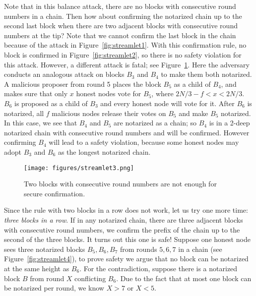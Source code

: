 \documentclass{article}
\begin{document}
 Note that in this balance attack, there are no blocks with consecutive round numbers in a chain. Then how about confirming the notarized chain up to the second last block when there are two adjacent blocks with consecutive round numbers at the tip? Note that we cannot confirm the last block in the chain because of the attack in Figure~\ref{fig:streamlet1}. With this confirmation rule, no block is confirmed in Figure~\ref{fig:streamlet2}, so there is no safety violation for this attack. However, a different  attack is fatal; see   Figure~\ref{fig:streamlet3}. Here the adversary conducts an analogous attack on blocks $B_3$ and $B_4$ to make them both notarized.  A malicious proposer from round 5 places the block $B_5$ as a child of $B_4$, and makes sure that only $x$ honest nodes vote for $B_5$, where $2N/3 -f<x<2N/3$. $B_6$ is proposed as a child of $B_3$ and every honest node will vote for it. After $B_6$ is notarized, all $f$ malicious nodes release their votes on $B_5$ and make $B_5$ notarized. In this case, we  see that $B_4$ and $B_5$ are notarized as  a chain; so $B_4$ is in a 2-deep notarized chain with consecutive round numbers and will be confirmed. However confirming $B_4$ will lead to a safety violation, because some honest nodes may adopt $B_3$ and $B_6$ as the longest notarized chain.

\begin{figure}
    \centering
    \texttt{[image: figures/streamlet3.png]}
    \caption{Two blocks with consecutive round numbers are not enough for secure confirmation.}
    \label{fig:streamlet3}
\end{figure}

 Since the rule with two blocks in a row does not work, let us try one more time: {\em three blocks in a row}. If in any notarized chain, there are three adjacent blocks with consecutive round numbers, we confirm the prefix of the chain up to the second of the three blocks. It turns out this one is safe! Suppose one honest node sees three notarized blocks $B_5,B_6,B_7$ from rounds $5,6,7$ in a chain (see Figure~\ref{fig:streamlet4}), to prove safety we argue that no block can be notarized at the same height as $B_6$. For the contradiction, suppose there is a notarized block $B$ from round $X$ conflicting $B_6$. Due to the fact that at most one block can be notarized per round, we know $X>7$ or $X<5$.
\end{document}
